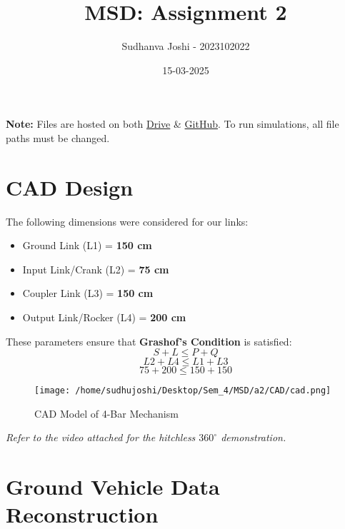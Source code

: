 \documentclass[a4paper]{article}
\title{MSD: Assignment 2}
\author{Sudhanva Joshi - 2023102022}
\date{15-03-2025}
\begin{document}
\maketitle

\textbf{Note:} Files are hosted on both \href{https://drive.google.com/drive/folders/1z5piVqWysUddM3gHnERhf8o2fc77_pmU?usp=sharing}{Drive} \& \href{https://github.com/sudhu-joshi/msd-a2}{GitHub}.
To run simulations, all file paths must be changed.
\section{CAD Design}
The following dimensions were considered for our links:
\begin{itemize}
    \item Ground Link (L1) = \textbf{150 cm}
    \item Input Link/Crank (L2) = \textbf{75 cm}
    \item Coupler Link (L3) = \textbf{150 cm}
    \item Output Link/Rocker (L4) = \textbf{200 cm}
\end{itemize}
These parameters ensure that \textbf{Grashof's Condition} is satisfied:
\[
S + L \leq P + Q 
\]
\[
L2 + L4 \leq L1 + L3
\]
\[
75 + 200 \leq 150 + 150 
\]

\begin{figure}[H]
    \centering
    \texttt{[image: /home/sudhujoshi/Desktop/Sem\_4/MSD/a2/CAD/cad.png]}
    \caption{CAD Model of 4-Bar Mechanism}
\end{figure}
\textit{Refer to the video attached for the hitchless $360^\circ$ demonstration.}

\clearpage
\section{Ground Vehicle Data Reconstruction}
\end{document}

